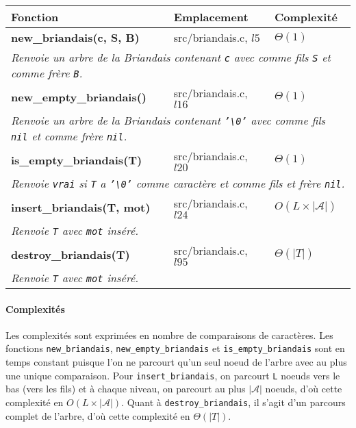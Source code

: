 \documentclass[11pt]{report} %
\begin{document}
\begin{center}
\begin{tabular}{|l|l|l|}
\hline
\textbf{Fonction} & \textbf{Emplacement} & \textbf{Complexité}\\
\hline
\textbf{new\_briandais(c, S, B)} & src/briandais.c, $l5$ & $\Theta(1)$\\
\hline
\multicolumn{3}{|l|}{\it{Renvoie un arbre de la Briandais contenant} \texttt{c} \it{avec comme fils \texttt{S} et comme frère \texttt{B}.}} \\
\hline
\textbf{new\_empty\_briandais()} & src/briandais.c, $l16$ & $\Theta(1)$\\
\hline
\multicolumn{3}{|l|}{\it{Renvoie un arbre de la Briandais contenant} \texttt{'\textbackslash 0'} \it{avec comme fils \texttt{nil} et comme frère \texttt{nil}.}} \\
\hline
\textbf{is\_empty\_briandais(T)} & src/briandais.c, $l20$ & $\Theta(1)$\\
\hline
\multicolumn{3}{|l|}{\it{Renvoie \texttt{vrai} si \texttt{T} a \texttt{'\textbackslash 0'} comme caractère et comme fils et frère \texttt{nil}.}} \\
\hline
\textbf{insert\_briandais(T, mot)} & src/briandais.c, $l24$ & $O(L \times |\mathcal{A}|)$\\
\hline
\multicolumn{3}{|l|}{\it{Renvoie \texttt{T} avec \texttt{mot} inséré.}} \\
\hline
\textbf{destroy\_briandais(T)} & src/briandais.c, $l95$ & $\Theta(|T|)$\\
\hline
\multicolumn{3}{|l|}{\it{Renvoie \texttt{T} avec \texttt{mot} inséré.}} \\
\hline
\end{tabular}
\end{center}

\paragraph{\textbf{Complexités}} Les complexités sont exprimées en nombre de comparaisons de caractères. Les fonctions \texttt{new\_briandais}, \texttt{new\_empty\_briandais} et \texttt{is\_empty\_briandais} sont en temps constant puisque l'on ne parcourt qu'un seul noeud de l'arbre avec au plus une unique comparaison. Pour \texttt{insert\_briandais}, on parcourt \texttt{L} noeuds vers le bas (vers les fils) et à chaque niveau, on parcourt au plus $|\mathcal{A}|$ noeuds, d'où cette complexité en $O(L \times |\mathcal{A}|)$. Quant à \texttt{destroy\_briandais}, il s'agit d'un parcours complet de l'arbre, d'où cette complexité en $\Theta(|T|)$.
\end{document}
